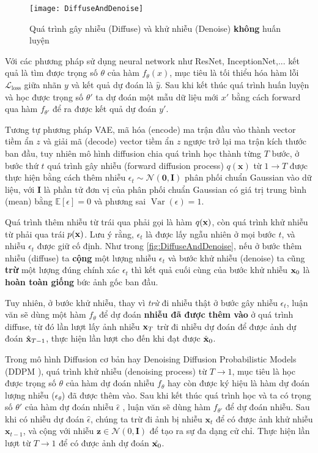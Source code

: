 \begin{figure}[H]
	\centering
	\texttt{[image: DiffuseAndDenoise]}
	\caption{Quá trình gây nhiễu (Diffuse) và khử nhiễu (Denoise) \textbf{không} huấn luyện}
	\label{fig:DiffuseAndDenoise}
\end{figure}

Với các phương pháp sử dụng neural network như ResNet, InceptionNet,... kết quả là tìm được trọng số $\theta$ của hàm $f_{\theta}(x)$, mục tiêu là tối thiểu hóa hàm lỗi $\mathcal{L}_\text{loss}$ giữa nhãn $y$ và kết quả dự đoán là $\hat{y}$. Sau khi kết thúc quá trình huấn luyện và học được trọng số $\theta'$ ta dự đoán một mẫu dữ liệu mới $x'$ bằng cách forward qua hàm $f_{\theta'}$ để ra được kết quả dự đoán $y'$.

Tương tự phương pháp VAE, mã hóa (encode) ma trận đầu vào thành vector tiềm ẩn $z$ và giải mã (decode) vector tiềm ẩn $z$ ngược trở lại ma trận kích thước ban đầu, tuy nhiên mô hình diffusion chia quá trình học thành từng $T$ bước, ở bước thứ $t$ quá trình gây nhiễu (forward diffusion process) $q(\mathbf{x})$ từ $1 \to T$ được thực hiện bằng cách thêm nhiễu $\epsilon_{t} \sim \mathcal{N} (\mathbf{0}, \mathbf{I})$ phân phối chuẩn Gaussian vào dữ liệu, với $\mathbf{I}$ là phần tử đơn vị của phân phối chuẩn Gaussian có giá trị trung bình  (mean) bằng $\mathbb{E}[\epsilon]=0$ và phương sai $\operatorname{Var}(\epsilon)=1$.


Quá trình thêm nhiễu từ trái qua phải gọi là hàm $q(\mathbf{x})$, còn quá trình khử nhiễu từ phải qua trái $p(\mathbf{x})$. Lưu ý rằng, $\epsilon_t$ là được lấy ngẫu nhiên ở mọi bước $t$, và nhiễu $\epsilon_t$ được giữ cố định. Như trong \autoref{fig:DiffuseAndDenoise}, nếu ở bước thêm nhiễu (diffuse) ta \textbf{cộng} một lượng nhiễu $\epsilon_t$ và bước khử nhiễu (denoise) ta cũng \textbf{trừ} một lượng đúng chính xác $\epsilon_t$ thì kết quả cuối cùng của bước khử nhiễu $\mathbf{x}_0$ là \textbf{hoàn toàn giống} bức ảnh gốc ban đầu.

Tuy nhiên, ở bước khử nhiễu, thay vì \textit{trừ} đi nhiễu thật ở bước gây nhiễu $\epsilon_t$, luận văn sẽ dùng một hàm $f_{\theta}$ để dự đoán \textbf{nhiễu đã được thêm vào} ở quá trình diffuse, từ đó lần lượt lấy ảnh nhiễu $\mathbf{x}_T$ trừ đi nhiễu dự đoán để được ảnh dự đoán $\hat{\mathbf{x}}_{T-1}$, thực hiện lần lượt cho đến khi đạt được $\hat{\mathbf{x}}_0$.

Trong mô hình Diffusion cơ bản hay Denoising Diffusion Probabilistic Models (DDPM \cite{ho2020denoising}), quá trình khử nhiễu (denoising process) từ $T \to 1$, mục tiêu là học được trọng số $\theta$ của hàm dự đoán nhiễu $f_{\theta}$ hay còn được ký hiệu là hàm dự đoán lượng nhiễu ($\epsilon_\theta$) đã được thêm vào. Sau khi kết thúc quá trình học và ta có trọng số $\theta'$ của hàm dự đoán nhiễu $\hat{\epsilon}$ , luận văn sẽ dùng hàm $f_{\theta'}$ để dự đoán nhiễu. Sau khi có nhiễu dự đoán $\hat{\epsilon}$, chúng ta trừ đi ảnh bị nhiễu $\mathbf{x}_{t}$ để có được ảnh khử nhiễu $\mathbf{x}_{t-1}$, và cộng với nhiễu $ \mathbf{z} \in \mathcal{N}(0, \mathbf{I})$ để tạo ra sự đa dạng cử chỉ. Thực hiện lần lượt từ $T \to 1$ để có được ảnh dự đoán $\hat{\mathbf{x}_0}$.

